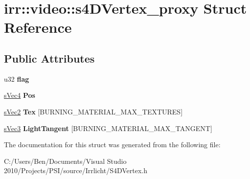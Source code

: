 \hypertarget{structirr_1_1video_1_1s4_d_vertex__proxy}{\section{irr\-:\-:video\-:\-:s4\-D\-Vertex\-\_\-proxy Struct Reference}
\label{structirr_1_1video_1_1s4_d_vertex__proxy}
}
\subsection*{Public Attributes}
\begin{DoxyCompactItemize}
\item 
\hypertarget{structirr_1_1video_1_1s4_d_vertex__proxy_a9d7e54cf6e938d99f7596855a0f62ebf}{u32 {\bfseries flag}}\label{structirr_1_1video_1_1s4_d_vertex__proxy_a9d7e54cf6e938d99f7596855a0f62ebf}

\item 
\hypertarget{structirr_1_1video_1_1s4_d_vertex__proxy_a7561da7d200b321b378837e9aca69e2d}{\hyperlink{structirr_1_1video_1_1s_vec4}{s\-Vec4} {\bfseries Pos}}\label{structirr_1_1video_1_1s4_d_vertex__proxy_a7561da7d200b321b378837e9aca69e2d}

\item 
\hypertarget{structirr_1_1video_1_1s4_d_vertex__proxy_abcfad995a81f174183a2d046d61b6e91}{\hyperlink{structirr_1_1video_1_1s_vec2}{s\-Vec2} {\bfseries Tex} \mbox{[}B\-U\-R\-N\-I\-N\-G\-\_\-\-M\-A\-T\-E\-R\-I\-A\-L\-\_\-\-M\-A\-X\-\_\-\-T\-E\-X\-T\-U\-R\-E\-S\mbox{]}}\label{structirr_1_1video_1_1s4_d_vertex__proxy_abcfad995a81f174183a2d046d61b6e91}

\item 
\hypertarget{structirr_1_1video_1_1s4_d_vertex__proxy_adc7ec8eb20ea2f23cbb07a0dcbe93d07}{\hyperlink{structirr_1_1video_1_1s_vec3}{s\-Vec3} {\bfseries Light\-Tangent} \mbox{[}B\-U\-R\-N\-I\-N\-G\-\_\-\-M\-A\-T\-E\-R\-I\-A\-L\-\_\-\-M\-A\-X\-\_\-\-T\-A\-N\-G\-E\-N\-T\mbox{]}}\label{structirr_1_1video_1_1s4_d_vertex__proxy_adc7ec8eb20ea2f23cbb07a0dcbe93d07}

\end{DoxyCompactItemize}


The documentation for this struct was generated from the following file\-:\begin{DoxyCompactItemize}
\item 
C\-:/\-Users/\-Ben/\-Documents/\-Visual Studio 2010/\-Projects/\-P\-S\-I/source/\-Irrlicht/S4\-D\-Vertex.\-h\end{DoxyCompactItemize}
